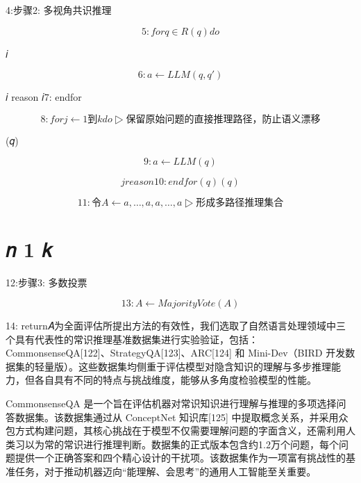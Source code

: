 \documentclass[12pt,a4paper,openright,UTF8]{ctexbook}
\begin{document}
4:步骤2: 多视角共识推理

\begin{equation}
5: forq \in R(q) do
\end{equation}

𝑖

\begin{equation}
6: a \leftarrow LLM (q,q')
\end{equation}

𝑖 reason 𝑖7: endfor

\begin{equation}
8: forj \leftarrow 1 到k do ▷保留原始问题的直接推理路径，防止语义漂移
\end{equation}

(𝑞)

\begin{equation}
9: a \leftarrow LLM (q)
\end{equation}


\begin{equation}
j reason 10: endfor (q) (q)
\end{equation}


\begin{equation}
11: 令A \leftarrow {a ,\ldots,a ,a ,\ldots,a } ▷形成多路径推理集合
\end{equation}


\chapter{𝑛 1 𝑘}

12:步骤3: 多数投票

\begin{equation}
13: A \leftarrow MajorityVote(A)
\end{equation}

14: return𝐴为全面评估所提出方法的有效性，我们选取了自然语言处理领域中三个具有代表性的常识推理基准数据集进行实验验证，包括：CommonsenseQA[122]、StrategyQA[123]、ARC[124] 和 Mini-Dev（BIRD 开发数据集的轻量版）。这些数据集均侧重于评估模型对隐含知识的理解与多步推理能力，但各自具有不同的特点与挑战维度，能够从多角度检验模型的性能。


CommonsenseQA 是一个旨在评估机器对常识知识进行理解与推理的多项选择问答数据集。该数据集通过从 ConceptNet 知识库[125] 中提取概念关系，并采用众包方式构建问题，其核心挑战在于模型不仅需要理解问题的字面含义，还需利用人类习以为常的常识进行推理判断。数据集的正式版本包含约1.2万个问题，每个问题提供一个正确答案和四个精心设计的干扰项。该数据集作为一项富有挑战性的基准任务，对于推动机器迈向“能理解、会思考”的通用人工智能至关重要。
\end{document}
